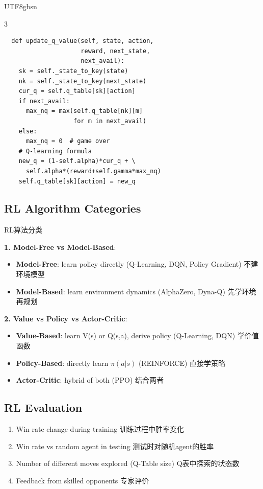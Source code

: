 \documentclass[9pt,landscape,a4paper]{article}
\newcommand{\zhint}[1]{{\scriptsize\color{gray!70!black}#1}}
\begin{document}
\begin{CJK}{UTF8}{gbsn}
\begin{multicols}{3}
\begin{lstlisting}
  def update_q_value(self, state, action,
                     reward, next_state,
                     next_avail):
    sk = self._state_to_key(state)
    nk = self._state_to_key(next_state)
    cur_q = self.q_table[sk][action]
    if next_avail:
      max_nq = max(self.q_table[nk][m]
                   for m in next_avail)
    else:
      max_nq = 0  # game over
    # Q-learning formula
    new_q = (1-self.alpha)*cur_q + \
      self.alpha*(reward+self.gamma*max_nq)
    self.q_table[sk][action] = new_q
\end{lstlisting}

\subsection{RL Algorithm Categories}
\zhint{RL算法分类}

\textbf{1. Model-Free vs Model-Based}:
\begin{itemize}[leftmargin=8pt,itemsep=0pt,topsep=0pt]
\item \textbf{Model-Free}: learn policy directly (Q-Learning, DQN, Policy Gradient) \zhint{不建环境模型}
\item \textbf{Model-Based}: learn environment dynamics (AlphaZero, Dyna-Q) \zhint{先学环境再规划}
\end{itemize}

\textbf{2. Value vs Policy vs Actor-Critic}:
\begin{itemize}[leftmargin=8pt,itemsep=0pt,topsep=0pt]
\item \textbf{Value-Based}: learn V(s) or Q(s,a), derive policy (Q-Learning, DQN) \zhint{学价值函数}
\item \textbf{Policy-Based}: directly learn $\pi(a|s)$ (REINFORCE) \zhint{直接学策略}
\item \textbf{Actor-Critic}: hybrid of both (PPO) \zhint{结合两者}
\end{itemize}

\subsection{RL Evaluation}
\begin{enumerate}[leftmargin=10pt,itemsep=0pt,topsep=0pt]
\item Win rate change during training \zhint{训练过程中胜率变化}
\item Win rate vs random agent in testing \zhint{测试时对随机agent的胜率}
\item Number of different moves explored (Q-Table size) \zhint{Q表中探索的状态数}
\item Feedback from skilled opponents \zhint{专家评价}
\end{enumerate}

\end{multicols}
\end{CJK}
\end{document}
